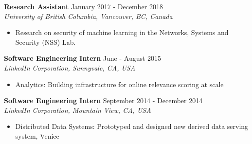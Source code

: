 \documentclass[10pt]{res} %
\begin{document}
\textbf{Research Assistant} \hfill January 2017 - December 2018 \\
{\sl University of British Columbia, Vancouver, BC, Canada }
\begin{itemize}  %
    \item Research on security of machine learning in the Networks, Systems and Security (NSS) Lab.
\end{itemize}

\textbf{Software Engineering Intern} \hfill June - August 2015 \\
{\sl LinkedIn Corporation, Sunnyvale, CA, USA }
\begin{itemize}  %
    \item Analytics: Building infrastructure for online relevance scoring at scale
\end{itemize}

\textbf{Software Engineering Intern} \hfill September 2014 - December 2014 \\[2pt]
{\sl LinkedIn Corporation, Mountain View, CA, USA} 
\begin{itemize}  %
    \item Distributed Data Systems: Prototyped and designed new derived data serving system, Venice
\end{itemize}
 
\end{document}
